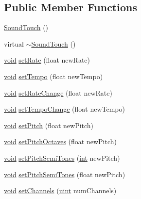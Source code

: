 \subsection*{Public Member Functions}
\begin{DoxyCompactItemize}
\item 
\hyperlink{classsoundtouch_1_1_sound_touch_a0f7939b14abaec4833587048ee438123}{Sound\+Touch} ()
\item 
virtual \hyperlink{classsoundtouch_1_1_sound_touch_afb33ca3dda3d1da8eb054e1476c2800a}{$\sim$\+Sound\+Touch} ()
\item 
\hyperlink{sound_8c_ae35f5844602719cf66324f4de2a658b3}{void} \hyperlink{classsoundtouch_1_1_sound_touch_aa06795e951d63165e120261166d91ff4}{set\+Rate} (float new\+Rate)
\item 
\hyperlink{sound_8c_ae35f5844602719cf66324f4de2a658b3}{void} \hyperlink{classsoundtouch_1_1_sound_touch_abc1d658360ee72002058e193fc63bf31}{set\+Tempo} (float new\+Tempo)
\item 
\hyperlink{sound_8c_ae35f5844602719cf66324f4de2a658b3}{void} \hyperlink{classsoundtouch_1_1_sound_touch_ab133fc1140aa6eb88d8e1d7b0709998b}{set\+Rate\+Change} (float new\+Rate)
\item 
\hyperlink{sound_8c_ae35f5844602719cf66324f4de2a658b3}{void} \hyperlink{classsoundtouch_1_1_sound_touch_a2d47b9daa9448c25b062ee59e0e675c1}{set\+Tempo\+Change} (float new\+Tempo)
\item 
\hyperlink{sound_8c_ae35f5844602719cf66324f4de2a658b3}{void} \hyperlink{classsoundtouch_1_1_sound_touch_ac772b7e06eae54216d18298987c64fb4}{set\+Pitch} (float new\+Pitch)
\item 
\hyperlink{sound_8c_ae35f5844602719cf66324f4de2a658b3}{void} \hyperlink{classsoundtouch_1_1_sound_touch_a72a92fe697263dab6faffaf0d6dd46aa}{set\+Pitch\+Octaves} (float new\+Pitch)
\item 
\hyperlink{sound_8c_ae35f5844602719cf66324f4de2a658b3}{void} \hyperlink{classsoundtouch_1_1_sound_touch_abca662d78b4314adcc6cf6ec3433cf29}{set\+Pitch\+Semi\+Tones} (\hyperlink{xmltok_8h_a5a0d4a5641ce434f1d23533f2b2e6653}{int} new\+Pitch)
\item 
\hyperlink{sound_8c_ae35f5844602719cf66324f4de2a658b3}{void} \hyperlink{classsoundtouch_1_1_sound_touch_aa0fc04a5a96d6e087a8f11100b3219c2}{set\+Pitch\+Semi\+Tones} (float new\+Pitch)
\item 
\hyperlink{sound_8c_ae35f5844602719cf66324f4de2a658b3}{void} \hyperlink{classsoundtouch_1_1_sound_touch_afe1b5dbb89cb719c3436be585211c054}{set\+Channels} (\hyperlink{_s_t_types_8h_a91ad9478d81a7aaf2593e8d9c3d06a14}{uint} num\+Channels)

\end{DoxyCompactItemize}
